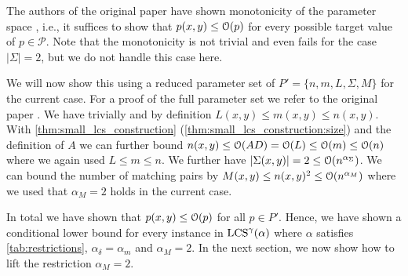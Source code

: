 The authors of the original paper have shown monotonicity of the parameter space \cite[section 4.2]{Bringman.2018}, i.e., it suffices to show that $p(x,y) \leq \mathcal{O}(p)$ for every possible target value of $p \in \mathcal{P}$.
Note that the monotonicity is not trivial and even fails for the case $|\Sigma| = 2$, but we do not handle this case here.


We will now show this using a reduced parameter set of $P' = \{n, m, L, \Sigma, M\}$ for the current case.
For a proof of the full parameter set we refer to the original paper \cite[section 9.1.2]{Bringman.2018}.
We have trivially and by definition $L(x,y) \leq m(x,y) \leq n(x,y)$.
With \autoref{thm:small_lcs_construction} (\ref{thm:small_lcs_construction:size}) and the definition of $A$ we can further bound $n(x,y) \leq \mathcal{O}(AD) = \mathcal{O}(L) \leq \mathcal{O}(m) \leq \mathcal{O}(n)$ where we again used $L \leq m \leq n$.
We further have $|\Sigma(x,y)| = 2 \leq \mathcal{O}(n^{\alpha_\Sigma})$.
We can bound the number of matching pairs by $M(x,y) \leq n(x,y)^2 \leq \mathcal{O}(n^{\alpha_M})$ where we used that $\alpha_M = 2$ holds in the current case.

In total we have shown that $p(x,y) \leq \mathcal{O}(p)$ for all $p \in P'$.
Hence, we have shown a conditional lower bound for every instance in $\text{LCS}^\gamma(\mathbb{\alpha})$ where $\mathbb{\alpha}$ satisfies \autoref{tab:restrictions}, $\alpha_\delta = \alpha_m$ and $\alpha_M = 2$.
In the next section, we now show how to lift the restriction $\alpha_M = 2$.


